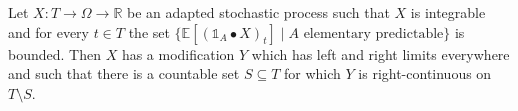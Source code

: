 \begin{theorem}\label{thm:exists_rightContinuous_modification_of_bounded_elemStochIntegral}
  \leanok
Let $X : T \to \Omega \to \mathbb{R}$ be an adapted stochastic process such that $X$ is integrable and for every $t \in T$ the set $\{\mathbb{E}[(\mathbb{1}_A \bullet X)_t] \mid A \text{ elementary predictable}\}$ is bounded.
Then $X$ has a modification $Y$ which has left and right limits everywhere and such that there is a countable set $S \subseteq T$ for which $Y$ is right-continuous on $T \setminus S$.
\end{theorem}

